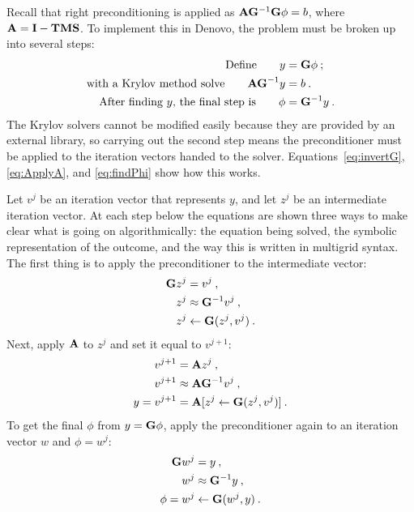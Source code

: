 Recall that right preconditioning is applied as $\mathbf{A} \mathbf{G}^{-1} \mathbf{G} \phi = b$, where $\mathbf{A} = \mathbf{I} - \mathbf{TMS}$. To implement this in Denovo, the problem must be broken up into several steps: 
%
\begin{align}
  \text{Define} \qquad y &= \mathbf{G}\phi \:;\\
  \text{with a Krylov method solve} \qquad \mathbf{AG}^{-1}y &= b \:. \\
  \text{After finding }y\text{, the final step is} \qquad \phi &= \mathbf{G}^{-1}y \:.
\end{align}
%
The Krylov solvers cannot be modified easily because they are provided by an external library, so carrying out the second step means the preconditioner must be applied to the iteration vectors handed to the solver. Equations~\eqref{eq:invertG}, \eqref{eq:ApplyA}, and \eqref{eq:findPhi} show how this works.  

Let $v^{j}$ be an iteration vector that represents $y$, and let $z^{j}$ be an intermediate iteration vector. At each step below the equations are shown three ways to make clear what is going on algorithmically: the equation being solved, the symbolic representation of the outcome, and the way this is written in multigrid syntax. The first thing is to apply the preconditioner to the intermediate vector: %
%
\begin{align}
  \mathbf{G}z^{j} &= v^{j} \:,  \label{eq:invertG} \\
  z^{j} &\approx \mathbf{G}^{-1}v^{j} \:, \nonumber \\
  z^{j} &\leftarrow \mathbf{G}(z^{j}, v^{j}) \:. \nonumber
\end{align}
%
Next, apply $\mathbf{A}$ to $z^{j}$ and set it equal to $v^{j+1}$:
\begin{align}
  v^{j+1} &= \mathbf{A}z^{j} \:,   \label{eq:ApplyA} \\
  v^{j+1} &\approx \mathbf{AG}^{-1}v^{j} \:, \nonumber \\
  y = v^{j+1} &= \mathbf{A}[z^{j} \leftarrow \mathbf{G}(z^{j}, v^{j})] \:. \nonumber
\end{align}
%
To get the final $\phi$ from $y = \mathbf{G}\phi$, apply the preconditioner again to an iteration vector $w$ and $\phi = w^{j}$:
%
\begin{align}
  \mathbf{G}w^{j} &= y \:,   \label{eq:findPhi} \\
  w^{j} &\approx \mathbf{G}^{-1}y \:, \nonumber \\
  \phi = w^{j} &\leftarrow \mathbf{G}(w^{j}, y) \:. \nonumber
\end{align}

